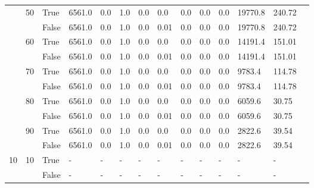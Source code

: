 \begin{landscape}
\begin{small}
\begin{longtable}[c]{@{}lll|ll|ll|ll|ll|lll@{}}
   & 50 & True  & 6561.0          & 0.0            & 1.0           & 0.0           & 0.0           & 0.0           & 0.0           & 0.0           & 19770.8       & 240.72      &  \\
   &    & False & 6561.0          & 0.0            & 1.0           & 0.0           & 0.01          & 0.0           & 0.0           & 0.0           & 19770.8       & 240.72      &  \\
   & 60 & True  & 6561.0          & 0.0            & 1.0           & 0.0           & 0.0           & 0.0           & 0.0           & 0.0           & 14191.4       & 151.01      &  \\
   &    & False & 6561.0          & 0.0            & 1.0           & 0.0           & 0.01          & 0.0           & 0.0           & 0.0           & 14191.4       & 151.01      &  \\
   & 70 & True  & 6561.0          & 0.0            & 1.0           & 0.0           & 0.0           & 0.0           & 0.0           & 0.0           & 9783.4        & 114.78      &  \\
   &    & False & 6561.0          & 0.0            & 1.0           & 0.0           & 0.01          & 0.0           & 0.0           & 0.0           & 9783.4        & 114.78      &  \\
   & 80 & True  & 6561.0          & 0.0            & 1.0           & 0.0           & 0.0           & 0.0           & 0.0           & 0.0           & 6059.6        & 30.75       &  \\
   &    & False & 6561.0          & 0.0            & 1.0           & 0.0           & 0.01          & 0.0           & 0.0           & 0.0           & 6059.6        & 30.75       &  \\
   & 90 & True  & 6561.0          & 0.0            & 1.0           & 0.0           & 0.0           & 0.0           & 0.0           & 0.0           & 2822.6        & 39.54       &  \\
   &    & False & 6561.0          & 0.0            & 1.0           & 0.0           & 0.01          & 0.0           & 0.0           & 0.0           & 2822.6        & 39.54       &  \\
  \midrule
10 & 10 & True  & -               & -              & -             & -             & -             & -             & -             & -             & -             & -           &  \\
   &    & False & -               & -              & -             & -             & -             & -             & -             & -             & -             & -           &  \\

\end{longtable}
\end{small}
\end{landscape}

